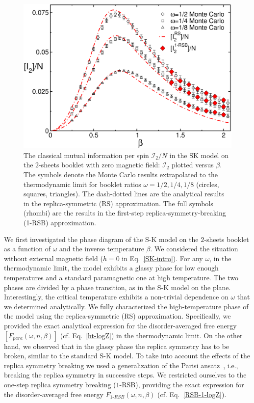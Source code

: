 \documentclass[twocolumn,superscriptaddress,prb,10pt]{revtex4-1}
\begin{document}
\begin{figure}[t]
\includegraphics*[width=0.93\linewidth]{./draft_figs/I2_extrapolated}
\caption{ The classical mutual information per spin ${\mathcal I}_2/N$ 
 in the SK model on the $2$-sheets booklet with zero magnetic field: 
 ${\mathcal I}_2$ plotted versus $\beta$. The symbols denote the 
 Monte Carlo results extrapolated to the thermodynamic limit for 
 booklet ratios $\omega=1/2,1/4,1/8$ (circles, squares, triangles). 
 The dash-dotted lines are the analytical results in the 
 replica-symmetric (RS) approximation. The full symbols (rhombi) 
 are the results in the first-step replica-symmetry-breaking (1-RSB) 
 approximation.
}
\label{I2-extrapolated}
\end{figure}


We first investigated the phase diagram of the S-K model on the $2$-sheets booklet as a 
function of $\omega$ and the inverse temperature $\beta$. We considered the situation 
without external magnetic field ($h=0$ in Eq.~\eqref{SK-intro}). For any $\omega$, in the 
thermodynamic limit, the model exhibits a glassy phase for low enough temperatures and 
a standard paramagnetic one at high temperature. The two phases are divided 
by a phase transition, as in the S-K model on the plane. Interestingly, the critical 
temperature exhibits a non-trivial dependence on $\omega$ that we determined analytically. 
We fully characterized the high-temperature phase of the model using the replica-symmetric 
(RS) approximation. Specifically, we provided the exact analytical expression for the 
disorder-averaged free energy $[F_{para}(\omega,n,\beta)]$  (cf. Eq.~\eqref{ht-logZ}) in 
the thermodynamic limit. On the other hand, we observed that in the glassy phase the 
replica symmetry has to be broken, similar to the standard S-K model. To take into account 
the effects of the replica symmetry breaking we used a generalization of the Parisi 
ansatz~\cite{parisi-1980}, i.e., breaking the replica symmetry in successive 
steps. We restricted ourselves to the one-step replica symmetry breaking ($1$-RSB),   
providing the exact expression for the disorder-averaged free energy $F_{1\textrm{-}RSB}
(\omega,n,\beta)$ (cf. Eq.~\eqref{RSB-1-logZ}). 
\end{document}
